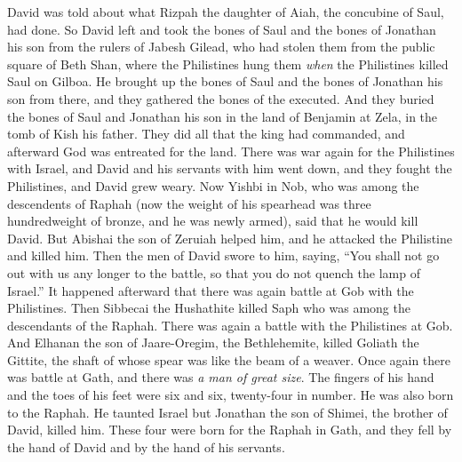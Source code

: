\begin{biblechapter}
\verse David was told about what Rizpah the daughter of Aiah, the concubine of Saul, had done.
\verse So David left and took the bones of Saul and the bones of Jonathan his son from the rulers of Jabesh Gilead, who had stolen them from the public square of Beth Shan, where the Philistines hung them \textit{when} the Philistines killed Saul on Gilboa.
\verse He brought up the bones of Saul and the bones of Jonathan his son from there, and they gathered the bones of the executed.
\verse And they buried the bones of Saul and Jonathan his son in the land of Benjamin at Zela, in the tomb of Kish his father. They did all that the king had commanded, and afterward God was entreated for the land.
 There was war again for the Philistines with Israel, and David and his servants with him went down, and they fought the Philistines, and David grew weary.
\verse Now Yishbi in Nob, who was among the descendents of Raphah (now the weight of his spearhead was three hundredweight of bronze, and he was newly armed), said that he would kill David.
\verse But Abishai the son of Zeruiah helped him, and he attacked the Philistine and killed him. Then the men of David swore to him, saying, “You shall not go out with us any longer to the battle, so that you do not quench the lamp of Israel.”
\verse It happened afterward that there was again battle at Gob with the Philistines. Then Sibbecai the Hushathite killed Saph who was among the descendants of the Raphah.
\verse There was again a battle with the Philistines at Gob. And Elhanan the son of Jaare-Oregim, the Bethlehemite, killed Goliath the Gittite, the shaft of whose spear was like the beam of a weaver.
\verse Once again there was battle at Gath, and there was \textit{a man of great size}. The fingers of his hand and the toes of his feet were six and six, twenty-four in number. He was also born to the Raphah.
\verse He taunted Israel but Jonathan the son of Shimei, the brother of David, killed him.
\verse These four were born for the Raphah in Gath, and they fell by the hand of David and by the hand of his servants.
\end{biblechapter}

